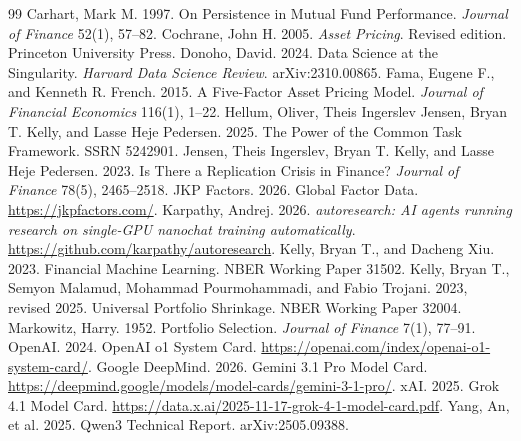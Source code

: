 \documentclass[11pt]{article}
\begin{document}
\begin{thebibliography}{99}
 Carhart, Mark M. 1997. On Persistence in Mutual Fund Performance. \emph{Journal of Finance} 52(1), 57--82.
 Cochrane, John H. 2005. \emph{Asset Pricing}. Revised edition. Princeton University Press.
 Donoho, David. 2024. Data Science at the Singularity. \emph{Harvard Data Science Review}. arXiv:2310.00865.
 Fama, Eugene F., and Kenneth R. French. 2015. A Five-Factor Asset Pricing Model. \emph{Journal of Financial Economics} 116(1), 1--22.
 Hellum, Oliver, Theis Ingerslev Jensen, Bryan T. Kelly, and Lasse Heje Pedersen. 2025. The Power of the Common Task Framework. SSRN 5242901.
 Jensen, Theis Ingerslev, Bryan T. Kelly, and Lasse Heje Pedersen. 2023. Is There a Replication Crisis in Finance? \emph{Journal of Finance} 78(5), 2465--2518.
 JKP Factors. 2026. Global Factor Data. \url{https://jkpfactors.com/}.
 Karpathy, Andrej. 2026. \emph{autoresearch: AI agents running research on single-GPU nanochat training automatically}. \url{https://github.com/karpathy/autoresearch}.
 Kelly, Bryan T., and Dacheng Xiu. 2023. Financial Machine Learning. NBER Working Paper 31502.
 Kelly, Bryan T., Semyon Malamud, Mohammad Pourmohammadi, and Fabio Trojani. 2023, revised 2025. Universal Portfolio Shrinkage. NBER Working Paper 32004.
 Markowitz, Harry. 1952. Portfolio Selection. \emph{Journal of Finance} 7(1), 77--91.
 OpenAI. 2024. OpenAI o1 System Card. \url{https://openai.com/index/openai-o1-system-card/}.
 Google DeepMind. 2026. Gemini 3.1 Pro Model Card. \url{https://deepmind.google/models/model-cards/gemini-3-1-pro/}.
 xAI. 2025. Grok 4.1 Model Card. \url{https://data.x.ai/2025-11-17-grok-4-1-model-card.pdf}.
 Yang, An, et al. 2025. Qwen3 Technical Report. arXiv:2505.09388.
\end{thebibliography}
\end{document}
